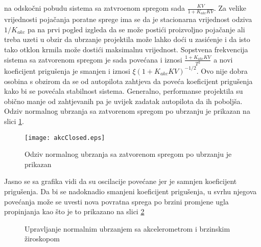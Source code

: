 na odskočni pobudu sistema sa zatvroenom spregom sada $\frac{KV}{1+K_{akc}KV}$. 
Za velike vrijednosti pojačanja poratne sprege ima se da je stacionarna vrijednost odziva 
$1/K_{akc}$ pa na prvi pogled izgleda da se može postići proizvoljno pojačanje ali treba 
uzeti u obzir da ubrzanje projektila može lahko doći u zasićenje i da isto tako 
otklon krmila može dostići maksimalnu vrijednost. Sopstvena frekvencija sistema 
sa zatvorenom spregom je sada povećana i iznosi $\frac{1+K_{akc}KV}{T^2}$ a novi 
koeficijent prigušenja je smanjen i iznosi $\xi (1+K_{akc}KV)^{-1/2}$. Ovo nije dobra 
osobina s obzirom da se od autopilota zahtjeva da poveća koeficijent prigušenja kako bi 
se povećala stabilnost sistema. Generalno, performanse projektila su obično 
manje od zahtjevanih pa je uvijek zadatak autopilota da ih poboljša. 
Odziv normalnog ubrzanja sa zatvorenom spregom po ubrzanju je prikazan na slici \ref{fig:akcClosed}.
\begin{figure}[!ht]
    \centering
    \texttt{[image: akcClosed.eps]}
    \caption{Odziv normalnog ubrzanja sa zatvorenom spregom po ubrzanju je prikazan}
    \label{fig:akcClosed}
\end{figure}
Jasno se sa grafika vidi da su oscilacije povećane jer je samnjen koeficijent prigušenja. 
Da bi se nadoknadio smanjeni koeficijent prigušenja, u svrhu njegova povećanja može se uvesti 
nova povratna sprega po brzini promjene ugla propinjanja kao što je to prikazano na slici 
\ref{fig:nz2loop}
\begin{figure}[!ht]
    \centering 
    \caption{Upravljanje normalnim ubrzanjem sa akcelerometrom i brzinskim žiroskopom}
    \label{fig:nz2loop}
\end{figure}

